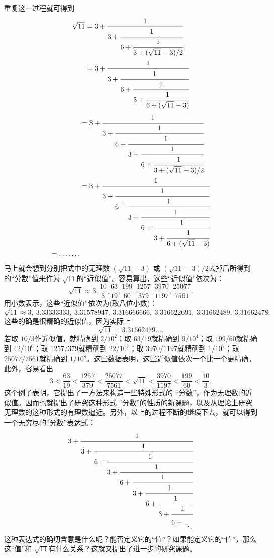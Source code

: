 \begin{example}
	重复这一过程就可得到
	\begin{align}
		\sqrt{11} & =
		3 + \cfrac{1}{3 +
			\cfrac{1}{6 +
				\cfrac{1}{3 +
					(\sqrt{11} -3)/2
		}}}          \label{cf5} \\
		          & =
		3 + \cfrac{1}{3 +
			\cfrac{1}{6 +
				\cfrac{1}{3 +
					\cfrac{1}{6 +
						(\sqrt{11} -3)
					}}}}          \label{cf6}
	\end{align}
	\begin{align}
		 & =
		3 + \cfrac{1}{3 +
			\cfrac{1}{6 +
				\cfrac{1}{3 +
					\cfrac{1}{6 +
						\cfrac{1}{3 +
							(\sqrt{11} -3) / 2
		}}}}}        \label{cf7}  \\
		 & =
		3 + \cfrac{1}{3 +
			\cfrac{1}{6 +
				\cfrac{1}{3 +
					\cfrac{1}{6 +
						\cfrac{1}{3 +
							\cfrac{1}{6 +
								(\sqrt{11} -3)
		}}}}}}        \label{cf8} \\
		= \dots\dots. \nonumber
	\end{align}
	马上就会想到分别把式中的无理数 \( (\sqrt{11} - 3) \) 或 \( (\sqrt{11} - 3)/2
	\)去掉后所得到的\enquote{分数}值来作为 \( \sqrt{11} \)的\enquote{近似值}。容易算出，这些\enquote{近似值}依次为：
	\begin{equation}\label{eq:根号11}
		\sqrt{11} \approx 3, \frac{10}{3}, \frac{63}{19}, \frac{199}{60}, \frac{1257}{379}, \frac{3970}{1197},
		\frac{25077}{7561}.
	\end{equation}
	用小数表示，这些\enquote{近似值}依次为(取八位小数)：
	\begin{equation}
		\sqrt{11} \approx 3,\: 3.33333333,\:3.31578947,\:3.316666666,\: 3.316622691,\: 3.31662489,\: 3.31662478.
	\end{equation}
	这些的确是很精确的近似值，因为实际上
	\begin{equation}
		\sqrt{11} = 3.31662479\dots.
	\end{equation}
	若取 \( 10 / 3 \)作近似值，就精确到 \( 2 / 10^2 \)；取 \( 63 / 19 \)就精确到 \( 9 / 10^4 \)；取 \( 199 / 60 \)就精确到
	\( 42 / 10^6 \)；取 \( 1257 / 379 \)就精确到 \( 22 / 10^7 \)；取 \( 3970 / 1197 \)就精确到 \( 1 / 10^7 \)；取 \( 25077 /
	7561\)就精确到 \( 1/10^8 \)。这些数据表明，这些近似值依次一个比一个更精确。此外，容易看出
	\begin{equation}
		3 < \frac{63}{19} < \frac{1257}{379} < \frac{25077}{7561} < \sqrt{11} < \frac{3970}{1197} < \frac{199}{60} <
		\frac{10}{3}.
	\end{equation}
	这个例子表明，它提出了一方法来构造一些特殊形式的 \enquote{分数}，作为无理数的近似值。因而也就提出了研究这种形式
	\enquote{分数}的性质的新课题，以及从理论上研究无理数的这种形式的有理数逼近。另外，以上的过程不断的继续下去，就可以得到
	一个无穷尽的\enquote{分数}表达式：
	\begin{equation}
		3 + \cfrac{1}{3 +
			\cfrac{1}{6 +
				\cfrac{1}{3 +
					\cfrac{1}{6 +
						\cfrac{1}{3 +
							\cfrac{1}{6 +
								\cfrac{1}{3 +
									\cfrac{1}{6 +
										\genfrac{}{}{0pt}{}{\phantom{1}}{\ddots}
									}}}}}}}}
	\end{equation}
	这种表达式的确切含意是什么呢？能否定义它的\enquote{值}？如果能定义它的\enquote{值}，那么这\enquote{值}和 \( \sqrt{11}
	\)有什么关系？这就又提出了进一步的硏究课题。
\end{example}

